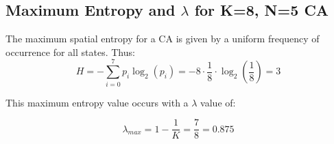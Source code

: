 \documentclass[a4paper,11pt,twoside]{report}
\begin{document}
\begin{appendices}
\section{Maximum Entropy and $\lambda$ for K=8, N=5 CA}
\label{appB:max_H}
The maximum spatial entropy for a CA is given by a uniform frequency of occurrence for all states. Thus:
\begin{equation}
H = - \sum^{7}_{i=0} p_i \log_2(p_i) = - 8 \cdot \frac{1}{8} \cdot \log_2(\frac{1}{8}) = 3
\end{equation}

This maximum entropy value occurs with a $\lambda$ value of:

\begin{equation}
\lambda_{max} = 1 - \frac{1}{K} = \frac{7}{8} = 0.875 
\end{equation}

\processdelayedfloats
\end{appendices}



\end{document}

